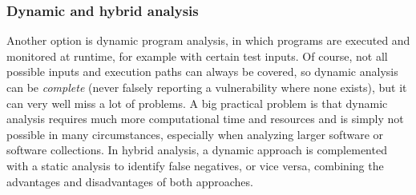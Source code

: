\documentclass[
	a4paper,
	pagesize,
	pdftex,
	12pt,
	twoside, %
	BCOR=5mm, %
	ngerman,
	fleqn,
	final,
	]{scrartcl}
\begin{document}
\subsubsection{Dynamic and hybrid analysis}
Another option is dynamic program analysis, in which programs are executed and monitored at runtime, for example with certain test inputs. Of course, not all possible inputs and execution paths can always be covered, so dynamic analysis can be \textit{complete} (never falsely reporting a vulnerability where none exists), but it can very well miss a lot of problems. A big practical problem is that dynamic analysis requires much more computational time and resources and is simply not possible in many circumstances, especially when analyzing larger software or software collections.
In hybrid analysis, a dynamic approach is complemented with a static analysis to identify false negatives, or vice versa, combining the advantages and disadvantages of both approaches. 
\end{document}

